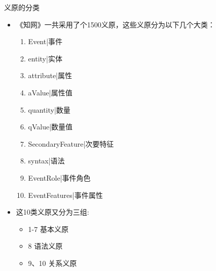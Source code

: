\documentclass{beamer}
\begin{document}
    \begin{frame}{义原的分类}
      \begin{itemize}
        \item 《知网》一共采用了个1500义原，这些义原分为以下几个大类：
          \begin{enumerate}
            \item Event|事件
            \item entity|实体 
            \item attribute|属性
            \item aValue|属性值
            \item quantity|数量
            \item qValue|数量值 
            \item SecondaryFeature|次要特征
            \item syntax|语法
            \item EventRole|事件角色
            \item EventFeatures|事件属性 
          \end{enumerate}
        \item 这10类义原又分为三组:
          \begin{itemize}
            \item 1-7 基本义原
            \item 8 语法义原
            \item 9、10 关系义原
          \end{itemize}
      \end{itemize}
    \end{frame}
\end{document}

